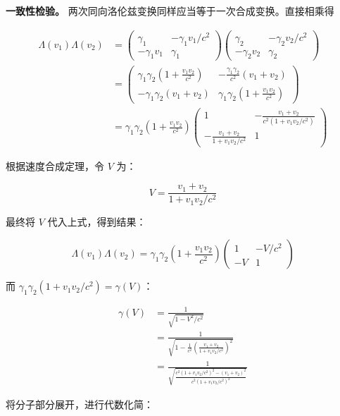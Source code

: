 \documentclass[
  chinese,
  a4paper,
  UTF8,
  12pt,
  oneside,
  openany]{ctexbook}
\theoremstyle{plain}
\theoremstyle{plain}
\theoremstyle{plain}
\theoremstyle{definition}
\theoremstyle{plain}
\theoremstyle{plain}
\theoremstyle{remark}
\begin{document}
\textbf{一致性检验。}
两次同向洛伦兹变换同样应当等于一次合成变换。直接相乘得

\[
\begin{aligned}
\Lambda(v_1)\Lambda(v_2) &= \begin{pmatrix} \gamma_1 & -\gamma_1 v_1/c^2 \\ -\gamma_1 v_1 & \gamma_1 \end{pmatrix} \begin{pmatrix} \gamma_2 & -\gamma_2 v_2/c^2 \\ -\gamma_2 v_2 & \gamma_2 \end{pmatrix} \\
&= \begin{pmatrix} \gamma_1\gamma_2 \left(1 + \frac{v_1v_2}{c^2}\right) & -\frac{\gamma_1\gamma_2}{c^2}(v_1 + v_2) \\ -\gamma_1\gamma_2(v_1 + v_2) & \gamma_1\gamma_2 \left(1 + \frac{v_1v_2}{c^2}\right) \end{pmatrix} \\
&= \gamma_1\gamma_2 \left(1 + \frac{v_1v_2}{c^2}\right) \begin{pmatrix} 1 & -\frac{v_1+v_2}{c^2(1 + v_1v_2/c^2)} \\ -\frac{v_1+v_2}{1 + v_1v_2/c^2} & 1 \end{pmatrix}
\end{aligned}
\]

根据速度合成定理，令 \(V\) 为：

\[
V = \frac{v_1 + v_2}{1 + v_1v_2/c^2}
\]

最终将 \(V\) 代入上式，得到结果：

\[
\Lambda(v_1)\Lambda(v_2) = \gamma_1\gamma_2 \left(1 + \frac{v_1v_2}{c^2}\right) \begin{pmatrix} 1 & -V/c^2 \\ -V & 1 \end{pmatrix}
\]

而
\(\gamma_{1}\gamma_{2}\left(1 + v_{1}v_{2}/c^{2}\right) = \gamma(V)\)：

\[
\begin{aligned}
\gamma(V) &= \frac{1}{\sqrt{1 - V^2/c^2}} \\
&= \frac{1}{\sqrt{1 - \frac{1}{c^2} \left( \frac{v_1 + v_2}{1 + v_1v_2/c^2} \right)^2}} \\
&= \frac{1}{\sqrt{\frac{c^2(1 + v_1v_2/c^2)^2 - (v_1 + v_2)^2}{c^2(1 + v_1v_2/c^2)^2}}}
\end{aligned}
\]

将分子部分展开，进行代数化简：
\end{document}
